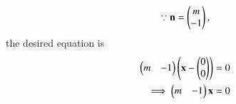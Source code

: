 \begin{align}
\because			\mathbf{n} =\begin{pmatrix}m \\ -1\end{pmatrix},
		\end{align}
		the desired equation is 
		\begin{align}
			\begin{pmatrix}m & -1\end{pmatrix}\left(\mathbf{x}-\begin{pmatrix}0\\0\end{pmatrix}\right) &=0\\
\implies			\begin{pmatrix}m & -1\end{pmatrix}\mathbf{x} &= 0
		\end{align}
